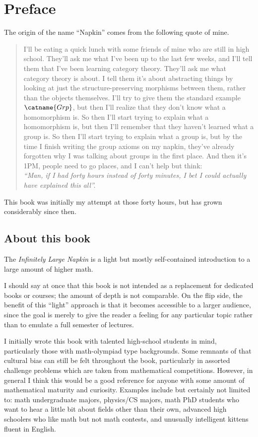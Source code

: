 \chapter{Preface}
The origin of the name ``Napkin''
comes from the following quote of mine.
\begin{quote}
\small
I'll be eating a quick lunch with some friends of mine
who are still in high school.
They'll ask me what I've been up to the last few weeks,
and I'll tell them that I've been learning category theory.
They'll ask me what category theory is about.
I tell them it's about abstracting things by looking at just the
structure-preserving morphisms between them, rather than the objects themselves.
I'll try to give them the standard example $\catname{Grp}$,
but then I'll realize that they don't know what a homomorphism is.
So then I'll start trying to explain what a homomorphism is,
but then I'll remember that they haven't learned what a group is.
So then I'll start trying to explain what a group is,
but by the time I finish writing the group axioms on my napkin,
they've already forgotten why I was talking about groups in the first place.
And then it's 1PM, people need to go places, and I can't help but think: \\[0.5ex]
\emph{``Man, if I had forty hours instead of forty minutes,
I bet I could actually have explained this all''.}
\end{quote}
This book was initially my attempt at those forty hours,
but has grown considerably since then.

\section*{About this book}
The \emph{Infinitely Large Napkin} is a light
but mostly self-contained introduction to a large
amount of higher math.

I should say at once that this book is not intended
as a replacement for dedicated books or courses;
the amount of depth is not comparable.
On the flip side, the benefit of this ``light'' approach
is that it becomes accessible to a larger audience,
since the goal is merely to give the reader a feeling for
any particular topic rather than to emulate a full semester of lectures.

I initially wrote this book with talented high-school students in mind,
particularly those with math-olympiad type backgrounds.
Some remnants of that cultural bias can still be felt throughout the book,
particularly in assorted challenge problems which are
taken from mathematical competitions.
However, in general I think this would be a good reference
for anyone with some amount of mathematical maturity and curiosity.
Examples include but certainly not limited to:
math undergraduate majors, physics/CS majors,
math PhD students who want to hear a little bit
about fields other than their own,
advanced high schoolers who like math but not math contests,
and unusually intelligent kittens fluent in English.

